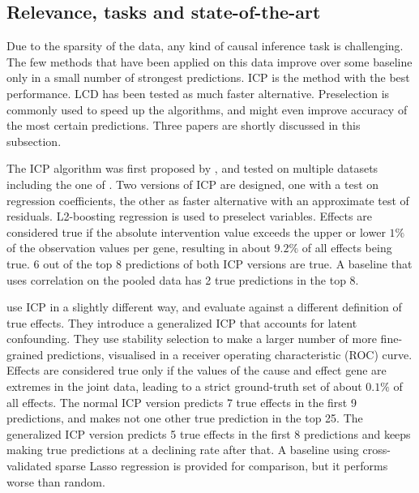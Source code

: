 \subsection{Relevance, tasks and state-of-the-art}

Due to the sparsity of the data, any kind of causal inference task is challenging. The few methods that have been applied on this data improve over some baseline only in a small number of strongest predictions. ICP is the method with the best performance. LCD has been tested as much faster alternative. Preselection is commonly used to speed up the algorithms, and might even improve accuracy of the most certain predictions. Three papers are shortly discussed in this subsection.

The ICP algorithm was first proposed by \textbf{\citet{peters2016causal}}, and tested on multiple datasets including the one of \citet{kemmeren2014large}. Two versions of ICP are designed, one with a test on regression coefficients, the other as faster alternative with an approximate test of residuals. L2-boosting regression \citep{schapire1998boosting} is used to preselect variables. Effects are considered true if the absolute intervention value exceeds the upper or lower $1\%$ of the observation values per gene, resulting in about $9.2\%$ of all effects being true. 6 out of the top 8 predictions of both ICP versions are true. A baseline that uses correlation on the pooled data has 2 true predictions in the top 8.

\textbf{\citet{meinshausen2016methods}} use ICP in a slightly different way, and evaluate against a different definition of true effects. They introduce a generalized ICP that accounts for latent confounding. They use stability selection \citep{meinshausen2010stability} to make a larger number of more fine-grained predictions, visualised in a receiver operating characteristic (ROC) curve. Effects are considered true only if the values of the cause and effect gene are extremes in the joint data, leading to a strict ground-truth set of about $0.1\%$ of all effects. The normal ICP version predicts 7 true effects in the first 9 predictions, and makes not one other true prediction in the top 25. The generalized ICP version predicts 5 true effects in the first 8 predictions and keeps making true predictions at a declining rate after that. A baseline using cross-validated sparse Lasso regression is provided for comparison, but it performs worse than random.

